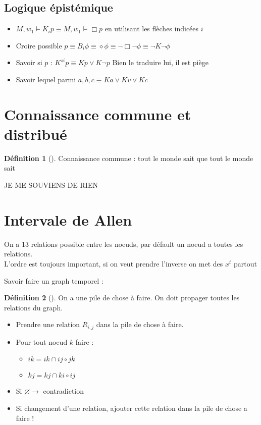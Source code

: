 \documentclass{article}
\theoremstyle{plain}%
\theoremstyle{definition}
\newtheorem{defn}{Définition}[section]
\theoremstyle{remark}
\begin{document}
\subsection{Logique épistémique}
\begin{itemize}
    \item $ M, w_1 \models K_i p \equiv M, w_1 \models \Box p $ en utilisant les flèches indicées $ i $
    \item Croire possible $ p \equiv B_i \phi \equiv \diamond \phi \equiv \neg \Box \neg \phi \equiv \neg K \neg \phi  $ 
    \item Savoir si $ p $ : $ K^{si} p \equiv K p \vee K \neg p $ Bien le traduire lui, il est piège
    \item Savoir lequel parmi $ a,b,c \equiv K a \vee K v \vee K c $ 
\end{itemize}

\section{Connaissance commune et distribué}
\begin{defn}[]
    Connaissance commune : tout le monde sait que tout le monde sait    
\end{defn}
JE ME SOUVIENS DE RIEN

\section{Intervale de Allen}
On a 13 relations possible entre les noeuds, par défault un noeud a toutes les relations. \\
L'ordre est toujours important, si on veut prendre l'inverse on met des $ x^t $ partout

Savoir faire un graph temporel : 
\begin{defn}[]
    On a une pile de chose à faire. On doit propager toutes les relations du graph. 
    \begin{itemize}
        \item Prendre une relation $ R_{i,j} $ dans la pile de chose à faire.
        \item Pour tout noeud $ k $ faire : \begin{itemize}
            \item $ ik = ik \cap ij \circ jk $ 
            \item $ kj = kj \cap ki \circ ij $ 
        \end{itemize}
        \item Si $ \varnothing \rightarrow $ contradiction
        \item Si changement d'une relation, ajouter cette relation dans la pile de chose a faire ! 
    \end{itemize}
\end{defn}
\end{document}
